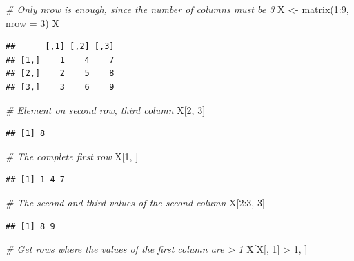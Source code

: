 \documentclass[
]{book}
\newenvironment{Shaded}{\begin{snugshade}}{\end{snugshade}}
\newcommand{\AttributeTok}[1]{\textcolor[rgb]{0.77,0.63,0.00}{#1}}
\newcommand{\CommentTok}[1]{\textcolor[rgb]{0.56,0.35,0.01}{\textit{#1}}}
\newcommand{\DecValTok}[1]{\textcolor[rgb]{0.00,0.00,0.81}{#1}}
\newcommand{\FunctionTok}[1]{\textcolor[rgb]{0.00,0.00,0.00}{#1}}
\newcommand{\NormalTok}[1]{#1}
\newcommand{\OtherTok}[1]{\textcolor[rgb]{0.56,0.35,0.01}{#1}}
\newcommand{\SpecialCharTok}[1]{\textcolor[rgb]{0.00,0.00,0.00}{#1}}
\begin{document}
\begin{Shaded}
\begin{Highlighting}[]
\CommentTok{\# Only nrow is enough, since the number of columns must be 3}
\NormalTok{X }\OtherTok{\textless{}{-}} \FunctionTok{matrix}\NormalTok{(}\DecValTok{1}\SpecialCharTok{:}\DecValTok{9}\NormalTok{, }\AttributeTok{nrow =} \DecValTok{3}\NormalTok{)}
\NormalTok{X}
\end{Highlighting}
\end{Shaded}

\begin{verbatim}
##      [,1] [,2] [,3]
## [1,]    1    4    7
## [2,]    2    5    8
## [3,]    3    6    9
\end{verbatim}

\begin{Shaded}
\begin{Highlighting}[]
\CommentTok{\# Element on second row, third column}
\NormalTok{X[}\DecValTok{2}\NormalTok{, }\DecValTok{3}\NormalTok{]}
\end{Highlighting}
\end{Shaded}

\begin{verbatim}
## [1] 8
\end{verbatim}

\begin{Shaded}
\begin{Highlighting}[]
\CommentTok{\# The complete first row}
\NormalTok{X[}\DecValTok{1}\NormalTok{, ]}
\end{Highlighting}
\end{Shaded}

\begin{verbatim}
## [1] 1 4 7
\end{verbatim}

\begin{Shaded}
\begin{Highlighting}[]
\CommentTok{\# The second and third values of the second column}
\NormalTok{X[}\DecValTok{2}\SpecialCharTok{:}\DecValTok{3}\NormalTok{, }\DecValTok{3}\NormalTok{]}
\end{Highlighting}
\end{Shaded}

\begin{verbatim}
## [1] 8 9
\end{verbatim}

\begin{Shaded}
\begin{Highlighting}[]
\CommentTok{\# Get rows where the values of the first column are \textgreater{} 1}
\NormalTok{X[X[, }\DecValTok{1}\NormalTok{] }\SpecialCharTok{\textgreater{}} \DecValTok{1}\NormalTok{, ]}
\end{Highlighting}
\end{Shaded}
\end{document}
